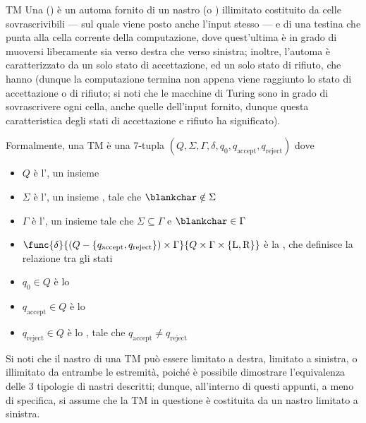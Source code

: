 \documentclass[a4paper, 12pt]{report}
\begin{document}
    \begin{frameddefn}[label={tm},breakable]{TM}
        Una  () è un automa fornito di un nastro (o ) illimitato costituito da celle sovrascrivibili --- sul quale viene posto anche l'input stesso --- e di una testina che punta alla cella corrente della computazione, dove quest'ultima è in grado di muoversi liberamente sia verso destra che verso sinistra; inoltre, l'automa è caratterizzato da un solo stato di accettazione, ed un solo stato di rifiuto, che hanno  (dunque la computazione termina non appena viene raggiunto lo stato di accettazione o di rifiuto; si noti che le macchine di Turing sono in grado di sovrascrivere ogni cella, anche quelle dell'input fornito, dunque questa caratteristica degli stati di accettazione e rifiuto ha significato).

        Formalmente, una TM è una 7-tupla $(Q, \Sigma, \Gamma, \delta, q_0, q_\mathrm{accept}, q_\mathrm{reject})$ dove

        \begin{itemize}
            \item $Q$ è l', un insieme 
            \item $\Sigma$ è l', un insieme , tale che $\blankchar \notin \Sigma$
            \item $\Gamma$ è l', un insieme  tale che $\Sigma \subseteq \Gamma$ e $\blankchar \in \Gamma$
            \item $\func{\delta}{(Q- \{q_\mathrm{accept}, q_\mathrm{reject}\}) \times \Gamma}{Q \times \Gamma \times \{ \mathrm L, \mathrm R\}}$ è la , che definisce la relazione tra gli stati
            \item $q_0 \in Q$ è lo 
            \item $q_\mathrm{accept} \in Q$ è lo 
            \item $q_\mathrm{reject} \in Q$ è lo , tale che $q_\mathrm{accept} \neq q_\mathrm{reject}$
        \end{itemize}

        Si noti che il nastro di una TM può essere limitato a destra, limitato a sinistra, o illimitato da entrambe le estremità, poiché è possibile dimostrare l'equivalenza delle 3 tipologie di nastri descritti; dunque, all'interno di questi appunti, a meno di specifica, si assume che la TM in questione è costituita da un nastro limitato a sinistra.


\end{frameddefn}
\end{document}
